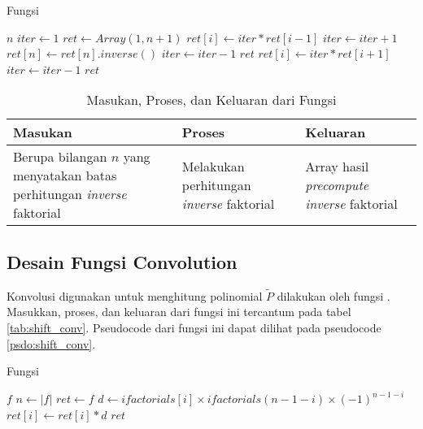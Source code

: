 \begin{algorithm}
	\caption{Fungsi }
	\label{psdo:shift_precom_ifactorials}
	\begin{algorithmic}[1]
		\Require $ n $
		\State $ iter \leftarrow 1 $
		\State $ ret \leftarrow Array(1, n+1) $
			\State $ ret[i] \leftarrow iter * ret[i-1] $
			\State $ iter \leftarrow iter + 1 $
		\EndFor
		\State $ ret[n] \leftarrow ret[n].inverse() $
		\State $ iter \leftarrow iter - 1 $
			\Return $ret$
		\EndIf
			\State $ ret[i] \leftarrow iter * ret[i+1] $
			\State $ iter \leftarrow iter - 1 $
		\EndFor
		\State \Return $ret$
	\end{algorithmic}
\end{algorithm}

\begin{table}[]	
	\Centering
	\begin{tabular}{|p{3cm}|p{3cm}|p{3cm}|}
	\hline
	Masukan & Proses & Keluaran \\ \hline
	Berupa bilangan $ n $ yang menyatakan batas perhitungan \textit{inverse} faktorial & Melakukan perhitungan \textit{inverse} faktorial & Array hasil \textit{precompute inverse} faktorial \\ \hline
	\end{tabular}
	\caption{Masukan, Proses, dan Keluaran dari Fungsi }
	\label{tab:shift_precom_ifactorials}
\end{table}

\newpage

\subsection{Desain Fungsi Convolution}
Konvolusi digunakan untuk menghitung polinomial $\tilde{P}$ dilakukan oleh fungsi . Masukkan, proses, dan keluaran dari fungsi ini tercantum pada tabel \ref{tab:shift_conv}. Pseudocode dari fungsi ini dapat dilihat pada pseudocode \ref{psdo:shift_conv}. 

\begin{algorithm}
	\caption{Fungsi }
	\label{psdo:shift_conv}
	\begin{algorithmic}[1]
		\Require $ f $
		\State $ n \leftarrow |f| $
		\State $ ret \leftarrow f $
			\State $ d \leftarrow ifactorials[i] \times ifactorials(n-1-i) \times (-1)^{n-1-i} $
			\State $ ret[i] \leftarrow ret[i] * d $
		\EndFor
		\State \Return $ret$
	\end{algorithmic}
\end{algorithm}

